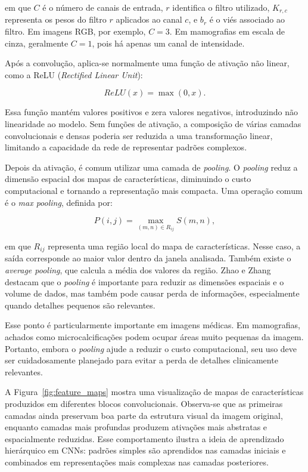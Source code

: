 \documentclass[
    12pt,
    openright,
    oneside,
    a4paper,
    english,
    brazil
]{abntex2}
\begin{document}
em que \(C\) é o número de canais de entrada, \(r\) identifica o filtro utilizado, \(K_{r,c}\) representa os pesos do filtro \(r\) aplicados ao canal \(c\), e \(b_r\) é o viés associado ao filtro. Em imagens RGB, por exemplo, \(C=3\). Em mamografias em escala de cinza, geralmente \(C=1\), pois há apenas um canal de intensidade.

Após a convolução, aplica-se normalmente uma função de ativação não linear, como a ReLU (\textit{Rectified Linear Unit}):

\[
ReLU(x) = \max(0,x).
\]

Essa função mantém valores positivos e zera valores negativos, introduzindo não linearidade ao modelo. Sem funções de ativação, a composição de várias camadas convolucionais e densas poderia ser reduzida a uma transformação linear, limitando a capacidade da rede de representar padrões complexos.

Depois da ativação, é comum utilizar uma camada de \textit{pooling}. O \textit{pooling} reduz a dimensão espacial dos mapas de características, diminuindo o custo computacional e tornando a representação mais compacta. Uma operação comum é o \textit{max pooling}, definida por:

\[
P(i,j) =
\max_{(m,n)\in R_{ij}}
S(m,n),
\]

em que \(R_{ij}\) representa uma região local do mapa de características. Nesse caso, a saída corresponde ao maior valor dentro da janela analisada. Também existe o \textit{average pooling}, que calcula a média dos valores da região. Zhao e Zhang \cite{zhao2024improvedpooling} destacam que o \textit{pooling} é importante para reduzir as dimensões espaciais e o volume de dados, mas também pode causar perda de informações, especialmente quando detalhes pequenos são relevantes.

Esse ponto é particularmente importante em imagens médicas. Em mamografias, achados como microcalcificações podem ocupar áreas muito pequenas da imagem. Portanto, embora o \textit{pooling} ajude a reduzir o custo computacional, seu uso deve ser cuidadosamente planejado para evitar a perda de detalhes clinicamente relevantes.

A Figura~\ref{fig:feature_maps} mostra uma visualização de mapas de características produzidos em diferentes blocos convolucionais. Observa-se que as primeiras camadas ainda preservam boa parte da estrutura visual da imagem original, enquanto camadas mais profundas produzem ativações mais abstratas e espacialmente reduzidas. Esse comportamento ilustra a ideia de aprendizado hierárquico em CNNs: padrões simples são aprendidos nas camadas iniciais e combinados em representações mais complexas nas camadas posteriores.
\end{document}
